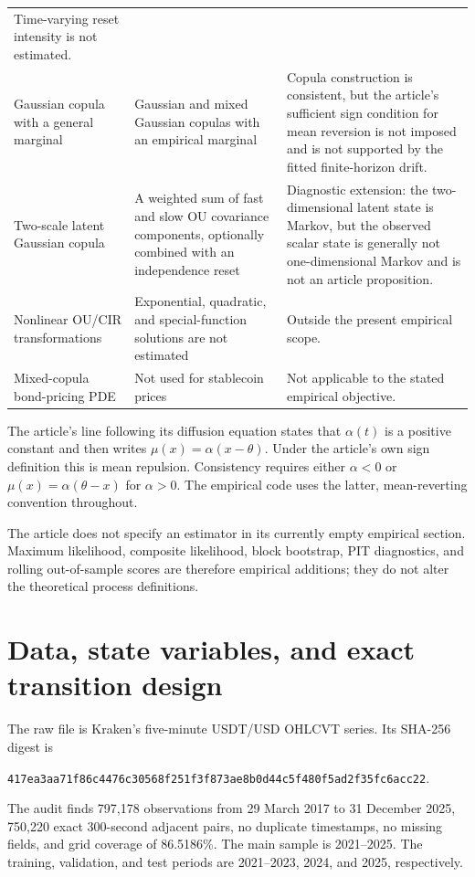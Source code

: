 \documentclass[11pt]{article}
\newcommand{\1}{\mathbf{1}}
\begin{document}
\begin{table}[htbp]
\begin{threeparttable}
\begin{tabular}{p{}p{}p{}}
Time-varying reset intensity is not estimated. \\
Gaussian copula with a general marginal & Gaussian and mixed Gaussian copulas
with an empirical marginal & Copula construction is consistent, but the
article's sufficient sign condition for mean reversion is not imposed and is
not supported by the fitted finite-horizon drift. \\
Two-scale latent Gaussian copula & A weighted sum of fast and slow OU covariance
components, optionally combined with an independence reset & Diagnostic extension:
the two-dimensional latent state is Markov, but the observed scalar state is
generally not one-dimensional Markov and is not an article proposition. \\
Nonlinear OU/CIR transformations & Exponential, quadratic, and special-function
solutions are not estimated & Outside the present empirical scope. \\
Mixed-copula bond-pricing PDE & Not used for stablecoin prices & Not applicable
to the stated empirical objective. \\
\bottomrule
\end{tabular}
\begin{tablenotes}[flushleft]\footnotesize
\item The article's line following its diffusion equation states that
$\alpha(t)$ is a positive constant and then writes $\mu(x)=\alpha(x-\theta)$.
Under the article's own sign definition this is mean repulsion.  Consistency
requires either $\alpha<0$ or $\mu(x)=\alpha(\theta-x)$ for $\alpha>0$.  The
empirical code uses the latter, mean-reverting convention throughout.
\end{tablenotes}
\end{threeparttable}
\end{table}

The article does not specify an estimator in its currently empty empirical
section.  Maximum likelihood, composite likelihood, block bootstrap, PIT
diagnostics, and rolling out-of-sample scores are therefore empirical additions;
they do not alter the theoretical process definitions.

\section{Data, state variables, and exact transition design}
\label{emp:sec:data}

The raw file is Kraken's five-minute USDT/USD OHLCVT series.  Its SHA-256 digest
is
\begin{center}
\texttt{417ea3aa71f86c4476c30568f251f3f873ae8b0d44c5f480f5ad2f35fc6acc22}.
\end{center}
The audit finds 797,178 observations from 29 March 2017 to 31 December 2025,
750,220 exact 300-second adjacent pairs, no duplicate timestamps, no missing
fields, and grid coverage of 86.5186\%.  The main sample is 2021--2025.  The
training, validation, and test periods are 2021--2023, 2024, and 2025,
respectively.
\end{document}
